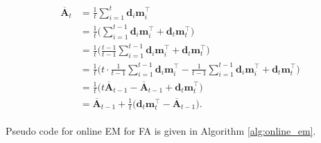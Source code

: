 \documentclass[msc,deptreport.inf]{infthesis} %
\newcommand{\matr}[1]{\mathbf{#1}}
\begin{document}
\begin{align}
\begin{split}
	\overline{\matr{A}}_t 
	& = \frac{1}{t} \sum_{i=1}^t \matr{d}_i \matr{m}_i^\intercal \\
	& = \frac{1}{t}\Bigg(\sum_{i=1}^{t-1} \matr{d}_i \matr{m}_i^\intercal + \matr{d}_t \matr{m}_t^\intercal \Bigg) \\
	& = \frac{1}{t}\Bigg(\frac{t-1}{t-1} \sum_{i=1}^{t-1} \matr{d}_i \matr{m}_i^\intercal + \matr{d}_t \matr{m}_t^\intercal \Bigg) \\
	& = \frac{1}{t}\Bigg(t \cdot \frac{1}{t-1} \sum_{i=1}^{t-1} \matr{d}_i \matr{m}_i^\intercal - \frac{1}{t-1} \sum_{i=1}^{t-1} \matr{d}_i \matr{m}_i^\intercal + \matr{d}_t \matr{m}_t^\intercal \Bigg) \\
	& = \frac{1}{t}\Big(t \overline{\matr{A}}_{t-1} - \overline{\matr{A}}_{t-1} + \matr{d}_t \matr{m}_t^\intercal \Big) \\
	& = \overline{\matr{A}}_{t-1} + \frac{1}{t} \big(\matr{d}_t \matr{m}_t^\intercal - \overline{\matr{A}}_{t-1} \big).
\end{split}
\end{align}

Pseudo code for online EM for FA is given in Algorithm \ref{alg:online_em}.
\end{document}
